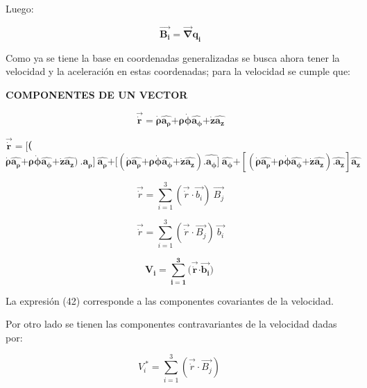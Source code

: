 \documentclass[]{article}
\begin{document}
Luego:

\[\overrightarrow{\mathbf{B}_{\mathbf{i}}}\mathbf{=}\overrightarrow{\mathbf{\nabla}}\mathbf{q}_{\mathbf{i}}\]

Como ya se tiene la base en coordenadas generalizadas se busca ahora
tener la velocidad y la aceleración en estas coordenadas; para la
velocidad se cumple que:

\textbf{COMPONENTES DE UN VECTOR}

\[\overrightarrow{\dot{\mathbf{r}}}\mathbf{=}\dot{\mathbf{\rho}}\widehat{\mathbf{a}_{\mathbf{\rho}}}\mathbf{+ \rho}\dot{\mathbf{\phi}}\widehat{\mathbf{a}_{\mathbf{\phi}}}\mathbf{+}\dot{\mathbf{z}}\widehat{\mathbf{a}_{\mathbf{z}}}\]

\(\overrightarrow{\dot{\mathbf{r}}}\mathbf{= \lbrack}\)\textbf{(}\(\dot{\mathbf{\rho}}\widehat{\mathbf{a}_{\mathbf{\rho}}}\mathbf{+ \rho}\dot{\mathbf{\phi}}\widehat{\mathbf{a}_{\mathbf{\phi}}}\mathbf{+}\dot{\mathbf{z}}\widehat{\mathbf{a}_{\mathbf{z}}}\mathbf{)}\mathbf{\ .}\widehat{\mathbf{a}_{\mathbf{\rho}}\mathbf{\rbrack\ }}\widehat{\mathbf{a}_{\mathbf{\rho}}}\mathbf{+ \lbrack}\left( \dot{\mathbf{\rho}}\widehat{\mathbf{a}_{\mathbf{\rho}}}\mathbf{+ \rho}\dot{\mathbf{\phi}}\widehat{\mathbf{a}_{\mathbf{\phi}}}\mathbf{+}\dot{\mathbf{z}}\widehat{\mathbf{a}_{\mathbf{z}}} \right)\widehat{\mathbf{.a}_{\mathbf{\phi}}\mathbf{\rbrack}}\mathbf{\ }\widehat{\mathbf{a}_{\mathbf{\phi}}}\mathbf{+}\left\lbrack \left( \dot{\mathbf{\rho}}\widehat{\mathbf{a}_{\mathbf{\rho}}}\mathbf{+ \rho}\dot{\mathbf{\phi}}\widehat{\mathbf{a}_{\mathbf{\phi}}}\mathbf{+}\dot{\mathbf{z}}\widehat{\mathbf{a}_{\mathbf{z}}} \right)\widehat{\mathbf{.a}_{\mathbf{z}}} \right\rbrack\widehat{\mathbf{a}_{\mathbf{z}}}\)

\[\overrightarrow{\dot{r}} = \sum_{i = 1}^{3}(\overrightarrow{\dot{r}} \cdot \overrightarrow{b_{i}})\ \overrightarrow{B_{j}}\]

\[\overrightarrow{\dot{r}} = \sum_{i = 1}^{3}(\overrightarrow{\dot{r}} \cdot \overrightarrow{B_{j}})\ \overrightarrow{b_{i}}\]

\[\mathbf{V}_{\mathbf{i}}\mathbf{=}\sum_{\mathbf{i = 1}}^{\mathbf{3}}\mathbf{(}\overrightarrow{\dot{\mathbf{r}}}\mathbf{\cdot}\overrightarrow{\mathbf{b}_{\mathbf{i}}}\mathbf{)\ }\]

La expresión (42) corresponde a las componentes covariantes de la
velocidad.

Por otro lado se tienen las componentes contravariantes de la velocidad
dadas por:

\[V_{i}^{\ *} = \sum_{i = 1}^{3}(\overrightarrow{\dot{r}} \cdot \overrightarrow{B_{j}})\ \]
\end{document}
